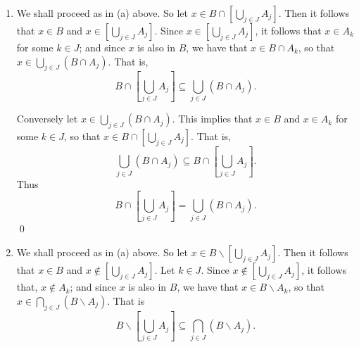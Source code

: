 \begin{enumerate}
\begin{enumerate}
               \textbf{Case 2:} $x \in \left[\bigcap_{j \in J}A_j\right]$. That
               is for every $j \in J$, we have $x \in A_j$, and thus,
               $x \in B \cup A_j$. Hence $x \in\bigcap_{j \in J}(B \cup A_j)$.\\

               In both cases, we showed that
               $x \in \bigcap_{j \in J}(B \cup A_j)$, so that
               $$B \cup \left[\bigcap_{j \in J}A_j\right] \subseteq
                 \bigcap_{j \in J}(B \cup A_j).$$

               Conversely let $x \in \bigcap_{j \in J}(B \cup A_j)$. This
               implies that for every $j \in J$, we must have that
               $x \in B \cup A_j$, so that $x \in B$ or $x \in A_j$. In either
               case, it is clear that
               $x \in B \cup \left[\bigcap_{j \in J}A_j\right]$. We have thus
               shown that
               $$\bigcap_{j \in J}(B \cup A_j) \subseteq
                 B \cup \left[\bigcap_{j \in J}A_j\right].$$
               That is
               $$B \cup \left[\bigcap_{j \in J}A_j\right] =
                 \bigcap_{j \in J}(B \cup A_j).$$ \qed
         \item We shall proceed as in (a) above. So let
               $x \in B \cap \left[\bigcup_{j \in J}A_j\right]$. Then it follows
               that $x \in B$ and $x \in \left[\bigcup_{j \in J}A_j\right]$.
               Since $x \in \left[\bigcup_{j \in J}A_j\right]$, it follows that
               $x \in A_k$ for some $k \in J$; and since $x$ is also in $B$, we
               have that $x \in B \cap A_k$, so that
               $x \in \bigcup_{j \in J}(B \cap A_j)$. That is,
               $$B \cap \left[\bigcup_{j \in J}A_j\right] \subseteq
                 \bigcup_{j \in J}(B \cap A_j).$$

               Conversely let $x \in \bigcup_{j \in J}(B \cap A_j)$. This
               implies that $x \in B$ and $x \in A_k$ for some $k \in J$, so
               that $x \in B \cap \left[\bigcup_{j \in J}A_j\right]$. That is,
               $$\bigcup_{j \in J}(B \cap A_j) \subseteq
                 B \cap \left[\bigcup_{j \in J}A_j\right].$$
               Thus
               $$B \cap \left[\bigcup_{j \in J}A_j\right] =
                 \bigcup_{j \in J}(B \cap A_j).$$ \qed
         \item We shall proceed as in (a) above. So let
               $x \in B{\backslash}\left[\bigcup_{j \in J}A_j\right]$. Then it 
               follows that $x \in B$ and
               $x \notin \left[\bigcup_{j \in J}A_j\right]$. Let $k \in J$.
               Since $x \notin \left[\bigcup_{j \in J}A_j\right]$, it follows 
               that, $x \notin A_k$; and since $x$ is also in $B$, we have that
               $x \in B{\backslash}A_k$, so that
               $x \in \bigcap_{j \in J}(B{\backslash}A_j)$. That is
               $$B{\backslash}{\left[\bigcup_{j \in J}A_j\right]} \subseteq
                 \bigcap_{j \in J}(B{\backslash}A_j).$$


\end{enumerate}
\end{enumerate}
